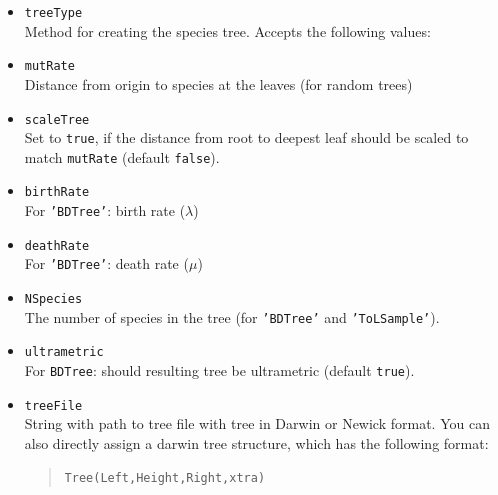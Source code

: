 \documentclass[11pt]{article}
\begin{document}
\begin{itemize}
\item{\texttt{treeType}} \hfill \\
Method for creating the species tree. Accepts the following values:
\item{\texttt{mutRate}} \hfill \\
Distance from origin to species at the leaves (for random trees)
\item{\texttt{scaleTree}} \hfill \\
Set to \texttt{true}, if the distance from root to deepest leaf should be scaled to match \texttt{mutRate} (default \texttt{false}).
\item{\texttt{birthRate}} \hfill \\
For \texttt{'BDTree'}: birth rate ($\lambda$)
\item{\texttt{deathRate}} \hfill \\
For \texttt{'BDTree'}: death rate ($\mu$)
\item{\texttt{NSpecies}} \hfill \\
The number of species in the tree (for \texttt{'BDTree'} and \texttt{'ToLSample'}).
\item{\texttt{ultrametric}} \hfill \\
For \texttt{BDTree}: should resulting tree be ultrametric (default \texttt{true}).
\item{\texttt{treeFile}} \hfill \\
String with path to tree file with tree in Darwin or Newick format. You can also directly assign a darwin tree structure, which has the following format:
\begin{quote}
\begin{verbatim}
Tree(Left,Height,Right,xtra)
\end{verbatim}
\end{quote}


\end{itemize}
\end{document}
